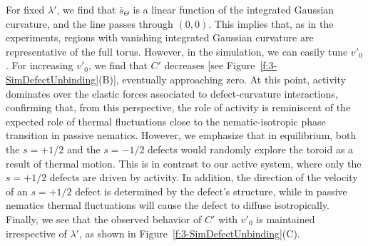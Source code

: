For fixed $\lambda'$, we find that $\overbar{s}_{\Theta}$ is a linear function of the integrated Gaussian curvature, and the line passes through $(0,0)$.
This implies that, as in the experiments, regions with vanishing integrated Gaussian curvature are representative of the full torus.
However, in the simulation, we can easily tune $v'_0$.
For increasing $v'_0$, we find that $C'$ decreases [see Figure~\ref{f:3-SimDefectUnbinding}(B)], eventually approaching zero.
At this point, activity dominates over the elastic forces associated to defect-curvature interactions, confirming that, from this perspective, the role of activity is reminiscent of the expected role of thermal fluctuations close to the nematic-isotropic phase transition in passive nematics.
However, we emphasize that in equilibrium, both the $s = +1/2$ and the $s = -1/2$ defects would randomly explore the toroid as a result of thermal motion.
This is in contrast to our active system, where only the $s = +1/2$ defects are driven by activity.
In addition, the direction of the velocity of an $s = +1/2$ defect is determined by the defect's structure, while in passive nematics thermal fluctuations will cause the defect to diffuse isotropically.
Finally, we see that the observed behavior of $C'$ with $v'_0$ is maintained irrespective of $\lambda'$, as shown in Figure~\ref{f:3-SimDefectUnbinding}(C).


